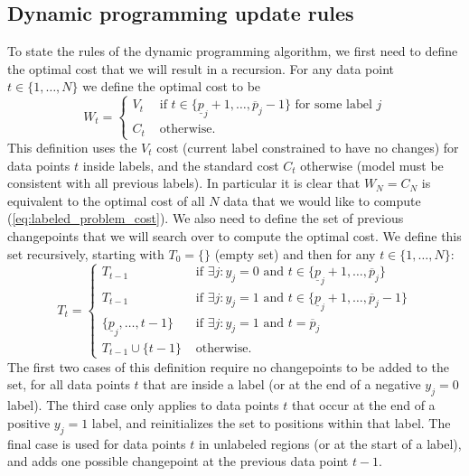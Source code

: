 \documentclass[12pt]{article}
\begin{document}
\subsection{Dynamic programming update rules}

To state the rules of the dynamic programming algorithm, we first need to define the optimal cost that we will result in a recursion. For any data point $t\in\{1, \dots, N\}$ we define the optimal cost to be
\begin{equation}
    W_t = \begin{cases}
    V_t & \text{ if } t\in \{\underline p_j + 1, \dots, \overline p_j - 1\} \text{ for some label } j \\
    C_t & \text{ otherwise.}
    \end{cases}
\end{equation}
This definition uses the $V_t$ cost (current label constrained to have no changes) for data points $t$ inside labels, and the standard cost $C_t$ otherwise (model must be consistent with all previous labels). In particular it is clear that $W_N=C_N$ is equivalent to the optimal cost of all $N$ data that we would like to compute (\ref{eq:labeled_problem_cost}).
We also need to define the set of previous changepoints that we will search over to compute the optimal cost. We define this set recursively, starting with $T_0=\{\}$ (empty set) and then for any $t\in\{1, \dots, N\}$:
\begin{equation}
    T_t = \begin{cases}
    T_{t-1} & \text{ if } 
    \exists j: y_j=0 \text{ and } 
    t\in \{\underline p_j + 1, \dots, \overline p_j \}\\
    T_{t-1} & \text{ if } 
    \exists j: y_j=1 \text{ and } 
    t\in \{\underline p_j + 1, \dots, \overline p_j - 1\}\\
    \{\underline p_j, \dots, t-1\} & \text{ if } 
    \exists j: y_j=1 \text{ and } 
    t= \overline p_j \\
    T_{t-1}\cup \{t-1\} & \text{ otherwise.} 
    \end{cases}
    \label{eq:T_t}
\end{equation}
The first two cases of this definition require no changepoints to be added to the set, for all data points $t$ that are inside a label (or at the end of a negative $y_j=0$ label). 
The third case only applies to data points $t$ that occur at the end of a positive $y_j=1$ label, and reinitializes the set to positions within that label. 
The final case is used for data points $t$ in unlabeled regions (or at the start of a label), and adds one possible changepoint at the previous data point $t-1$.
\end{document}
